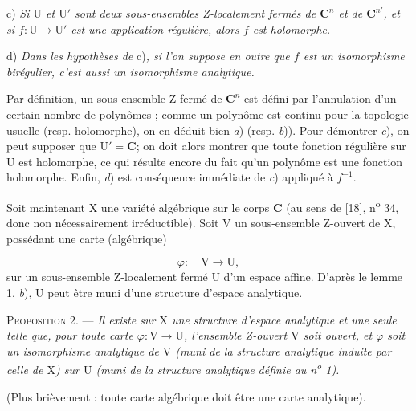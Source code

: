 c) \textit{Si $\mathrm{U}$ et $\mathrm{U}'$ sont deux sous-ensembles Z-localement fermés de $\mathbf{C}^n$ et de $\mathbf{C}^{n'}$, et si $f : \mathrm{U} \to \mathrm{U}'$ est une application régulière, alors $f$ est holomorphe.}

d) \textit{Dans les hypothèses de} c)\textit{, si l'on suppose en outre que $f$ est un isomorphisme birégulier, c'est aussi un isomorphisme analytique.}



Par définition, un sous-ensemble Z-fermé de $\mathbf{C}^n$ est défini par l'annulation d'un certain nombre de polynômes ; comme un polynôme est continu pour la topologie usuelle (resp. holomorphe), on en déduit bien \textit{a}) (resp. \textit{b})). Pour démontrer \textit{c}), on peut supposer que $\mathrm{U}' = \mathbf{C}$; on doit alors montrer que toute fonction régulière sur $\mathrm{U}$ est holomorphe, ce qui résulte encore du fait qu'un polynôme est une fonction holomorphe. Enfin, \textit{d}) est conséquence immédiate de \textit{c}) appliqué à $f^{-1}$.

Soit maintenant $\mathrm{X}$ une variété algébrique sur le corps $\mathbf{C}$ (au sens de [18], n\textsuperscript{o} 34, donc non nécessairement irréductible). Soit $\mathrm{V}$ un sous-ensemble Z-ouvert de $\mathrm{X}$, possédant une carte (algébrique)

\begin{equation*}
\varphi : \quad \mathrm{V} \to \mathrm{U},
\end{equation*}
sur un sous-ensemble Z-localement fermé $\mathrm{U}$ d'un espace affine. D'après le lemme 1, \textit{b}), $\mathrm{U}$ peut être muni d'une structure d'espace analytique.

\textsc{Proposition} 2. --- \textit{Il existe sur $\mathrm{X}$ une structure d'espace analytique et une seule telle que, pour toute carte $\varphi : \mathrm{V} \to \mathrm{U}$, l'ensemble Z-ouvert $\mathrm{V}$ soit ouvert, et $\varphi$ soit un isomorphisme analytique de $\mathrm{V}$ (muni de la structure analytique induite par celle de $\mathrm{X}$) sur $\mathrm{U}$ (muni de la structure analytique définie au n\textsuperscript{o} 1).}

(Plus brièvement : toute carte algébrique doit être une carte analytique).


